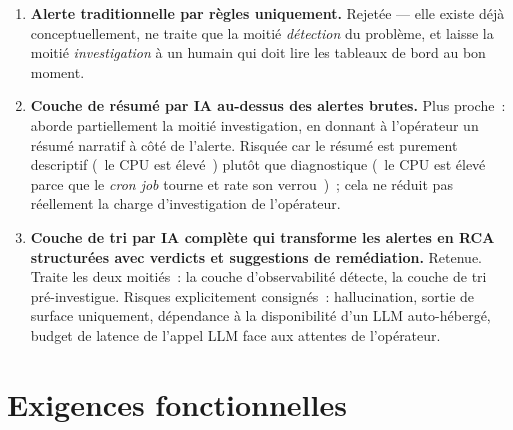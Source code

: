 \documentclass[11pt,a4paper,oneside]{report}
\begin{document}
\begin{enumerate}
  \item \textbf{Alerte traditionnelle par règles uniquement.}
        Rejetée --- elle existe déjà conceptuellement, ne traite que
        la moitié \emph{détection} du problème, et laisse la moitié
        \emph{investigation} à un humain qui doit lire les tableaux
        de bord au bon moment.
  \item \textbf{Couche de résumé par IA au-dessus des alertes
        brutes.} Plus proche~: aborde partiellement la moitié
        investigation, en donnant à l'opérateur un résumé narratif à
        côté de l'alerte. Risquée car le résumé est purement
        descriptif (\og~le CPU est élevé~\fg{}) plutôt que
        diagnostique (\og~le CPU est élevé parce que le \emph{cron
        job} tourne et rate son verrou~\fg{})~; cela ne réduit pas
        réellement la charge d'investigation de l'opérateur.
  \item \textbf{Couche de tri par IA complète qui transforme les
        alertes en RCA structurées avec verdicts et suggestions de
        remédiation.} Retenue. Traite les deux moitiés~: la couche
        d'observabilité détecte, la couche de tri pré-investigue.
        Risques explicitement consignés~: hallucination, sortie de
        surface uniquement, dépendance à la disponibilité d'un LLM
        auto-hébergé, budget de latence de l'appel LLM face aux
        attentes de l'opérateur.
\end{enumerate}

\section{Exigences fonctionnelles}
\end{document}
